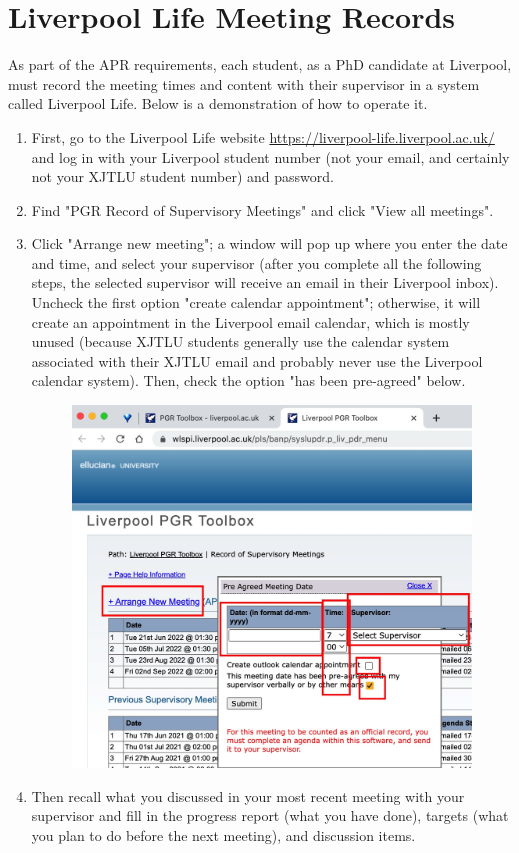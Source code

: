 \section{Liverpool Life Meeting Records}
\label{sec.meeting_record}
As part of the APR requirements, each student, as a PhD candidate at Liverpool, must record the meeting times and content with their supervisor in a system called Liverpool Life. Below is a demonstration of how to operate it.

\begin{enumerate}
    \item First, go to the Liverpool Life website \url{https://liverpool-life.liverpool.ac.uk/} and log in with your Liverpool student number (not your email, and certainly not your XJTLU student number) and password.
    \item Find "PGR Record of Supervisory Meetings" and click "View all meetings".
    \item Click "Arrange new meeting"; a window will pop up where you enter the date and time, and select your supervisor (after you complete all the following steps, the selected supervisor will receive an email in their Liverpool inbox). Uncheck the first option "create calendar appointment"; otherwise, it will create an appointment in the Liverpool email calendar, which is mostly unused (because XJTLU students generally use the calendar system associated with their XJTLU email and probably never use the Liverpool calendar system). Then, check the option "has been pre-agreed" below.
    \begin{figure}[H]
        \centering
        \includegraphics[width=0.5\columnwidth]{author-folder/Kai.Wu/meeting_record_figures/arange_new_meeting.jpg}
    \end{figure}
    \item Then recall what you discussed in your most recent meeting with your supervisor and fill in the progress report (what you have done), targets (what you plan to do before the next meeting), and discussion items.

\end{enumerate}
